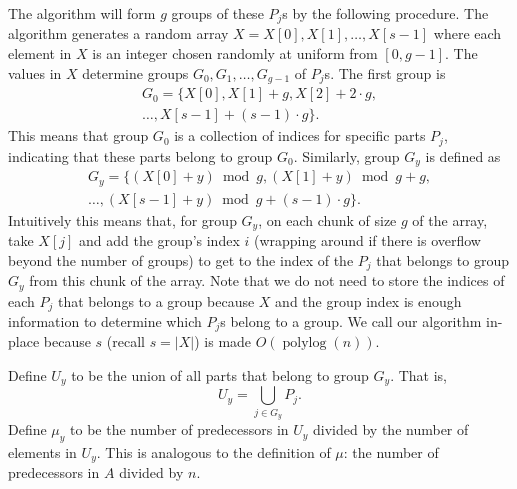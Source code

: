 \documentclass[twocolumn, twoside, 11pt]{article}
\def\polylog{\operatorname{polylog}}
\begin{document}
The algorithm will form $g$ groups of these $P_j$s by the following procedure. 
The algorithm generates a random array $X=X[0],X[1],\ldots,X[s-1]$ where each element in $X$ is an integer chosen randomly at uniform from $[0,g-1]$.
The values in $X$ determine groups $G_0, G_1, \ldots, G_{g-1}$ of $P_j$s.
The first group is 
\begin{multline*}
	G_0 = \{X[0], X[1]+g, X[2]+2\cdot g,\\ 
	\ldots,X[s-1]+ (s-1)\cdot g\}.
\end{multline*}
This means that group $G_0$ is a collection of indices for specific parts $P_j$, indicating that these parts belong to group $G_0$. Similarly, group $G_y$ is defined as 
\begin{multline*}
	G_y = \{(X[0]+y) \bmod g, (X[1]+y) \bmod g + g, \\
	\ldots, (X[s-1]+y) \bmod g + (s-1)\cdot g \}.
\end{multline*}
Intuitively this means that, for group $G_y$, on each chunk of size $g$ of the array, take $X[j]$ and add the group's index $i$ (wrapping around if there is overflow beyond the number of groups) to get to the index of the $P_j$ that belongs to group $G_y$ from this chunk of the array.
Note that we do not need to store the indices of each $P_j$ that belongs to a group because $X$ and the group index is enough information to determine which $P_j$s belong to a group.
We call our algorithm in-place because $s$ (recall $s = |X|$) is made $O(\polylog(n))$.

Define $U_y$ to be the union of all parts that belong to group $G_y$. That is,
$$U_y = \bigcup_{j\in G_y} P_j.$$
Define $\mu_y$ to be the number of predecessors in $U_y$ divided by the number of elements in $U_y$. This is analogous to the definition of $\mu$: the number of predecessors in $A$ divided by $n$.
\end{document}

